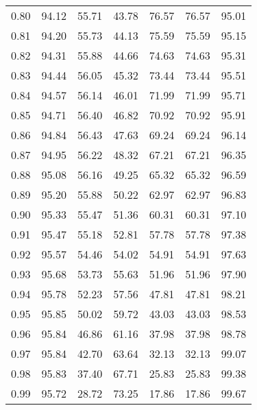 \begin{tabular}{|c|c|c|c|c|c|c|}
      0.80 &     94.12 &     55.71 &      43.78 &   76.57 &      76.57 &         95.01 \\
      0.81 &     94.20 &     55.73 &      44.13 &   75.59 &      75.59 &         95.15 \\
      0.82 &     94.31 &     55.88 &      44.66 &   74.63 &      74.63 &         95.31 \\
      0.83 &     94.44 &     56.05 &      45.32 &   73.44 &      73.44 &         95.51 \\
      0.84 &     94.57 &     56.14 &      46.01 &   71.99 &      71.99 &         95.71 \\
      0.85 &     94.71 &     56.40 &      46.82 &   70.92 &      70.92 &         95.91 \\
      0.86 &     94.84 &     56.43 &      47.63 &   69.24 &      69.24 &         96.14 \\
      0.87 &     94.95 &     56.22 &      48.32 &   67.21 &      67.21 &         96.35 \\
      0.88 &     95.08 &     56.16 &      49.25 &   65.32 &      65.32 &         96.59 \\
      0.89 &     95.20 &     55.88 &      50.22 &   62.97 &      62.97 &         96.83 \\
      0.90 &     95.33 &     55.47 &      51.36 &   60.31 &      60.31 &         97.10 \\
      0.91 &     95.47 &     55.18 &      52.81 &   57.78 &      57.78 &         97.38 \\
      0.92 &     95.57 &     54.46 &      54.02 &   54.91 &      54.91 &         97.63 \\
      0.93 &     95.68 &     53.73 &      55.63 &   51.96 &      51.96 &         97.90 \\
      0.94 &     95.78 &     52.23 &      57.56 &   47.81 &      47.81 &         98.21 \\
      0.95 &     95.85 &     50.02 &      59.72 &   43.03 &      43.03 &         98.53 \\
      0.96 &     95.84 &     46.86 &      61.16 &   37.98 &      37.98 &         98.78 \\
      0.97 &     95.84 &     42.70 &      63.64 &   32.13 &      32.13 &         99.07 \\
      0.98 &     95.83 &     37.40 &      67.71 &   25.83 &      25.83 &         99.38 \\
      0.99 &     95.72 &     28.72 &      73.25 &   17.86 &      17.86 &         99.67 \\
\bottomrule
\end{tabular}
